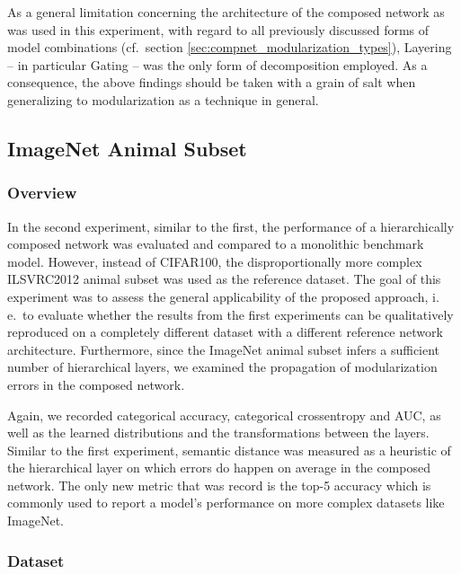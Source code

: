 As a general limitation concerning the architecture of the composed network as was used in this experiment, with regard to all previously discussed forms of model combinations (cf.\ section \ref{sec:compnet_modularization_types}), Layering -- in particular Gating -- was the only form of decomposition employed. As a consequence, the above findings should be taken with a grain of salt when generalizing to modularization as a technique in general.
            
\subsection{ImageNet Animal Subset%
            \label{sec:experiments_imagenet}}
            
\subsubsection{Overview%
               \label{sec:experiments_imagenet_overview}}
               
In the second experiment, similar to the first, the performance of a hierarchically composed network was evaluated and compared to a monolithic benchmark model. However, instead of CIFAR100, the disproportionally more complex ILSVRC2012 animal subset was used as the reference dataset. The goal of this experiment was to assess the general applicability of the proposed approach, i.\,e.\ to evaluate whether the results from the first experiments can be qualitatively reproduced on a completely different dataset with a different reference network architecture. Furthermore, since the ImageNet animal subset infers a sufficient number of hierarchical layers, we examined the propagation of modularization errors in the composed network.

Again, we recorded categorical accuracy, categorical crossentropy and AUC, as well as the learned distributions and the transformations between the layers. Similar to the first experiment, semantic distance was measured as a heuristic of the hierarchical layer on which errors do happen on average in the composed network. The only new metric that was record is the top-5 accuracy which is commonly used to report a model's performance on more complex datasets like ImageNet.
               
\subsubsection{Dataset%
               \label{sec:experiments_imagenet_dataset}}

